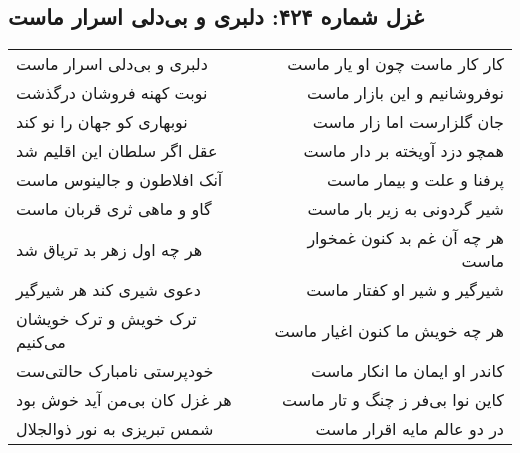 \begin{center}
\section*{غزل شماره ۴۲۴: دلبری و بی‌دلی اسرار ماست}
\label{sec:0424}
\begin{longtable}{l p{0.5cm} r}
دلبری و بی‌دلی اسرار ماست
&&
کار کار ماست چون او یار ماست
\\
نوبت کهنه فروشان درگذشت
&&
نوفروشانیم و این بازار ماست
\\
نوبهاری کو جهان را نو کند
&&
جان گلزارست اما زار ماست
\\
عقل اگر سلطان این اقلیم شد
&&
همچو دزد آویخته بر دار ماست
\\
آنک افلاطون و جالینوس ماست
&&
پرفنا و علت و بیمار ماست
\\
گاو و ماهی ثری قربان ماست
&&
شیر گردونی به زیر بار ماست
\\
هر چه اول زهر بد تریاق شد
&&
هر چه آن غم بد کنون غمخوار ماست
\\
دعوی شیری کند هر شیرگیر
&&
شیرگیر و شیر او کفتار ماست
\\
ترک خویش و ترک خویشان می‌کنیم
&&
هر چه خویش ما کنون اغیار ماست
\\
خودپرستی نامبارک حالتی‌ست
&&
کاندر او ایمان ما انکار ماست
\\
هر غزل کان بی‌من آید خوش بود
&&
کاین نوا بی‌فر ز چنگ و تار ماست
\\
شمس تبریزی به نور ذوالجلال
&&
در دو عالم مایه اقرار ماست
\\
\end{longtable}
\end{center}
